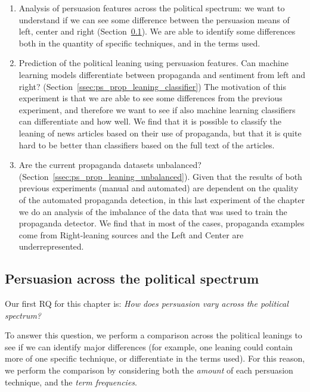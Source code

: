 \begin{enumerate}
    \item Analysis of persuasion features across the political spectrum: we want to understand if we can see some difference between the persuasion means of left, center and right (Section~\ref{ssec:ps_prop_leaning_across}). We are able to identify some differences both in the quantity of specific techniques, and in the terms used.
    \item Prediction of the political leaning using persuasion features. Can machine learning models differentiate between propaganda and sentiment from left and right? (Section~\ref{ssec:ps_prop_leaning_classifier}) The motivation of this experiment is that we are able to see some differences from the previous experiment, and therefore we want to see if also machine learning classifiers can differentiate and how well. We find that it is possible to classify the leaning of news articles based on their use of propaganda, but that it is quite hard to be better than classifiers based on the full text of the articles. 
    \item Are the current propaganda datasets unbalanced? (Section~\ref{ssec:ps_prop_leaning_unbalanced}). Given that the results of both previous experiments (manual and automated) are dependent on the quality of the automated propaganda detection, in this last experiment of the chapter we do an analysis of the imbalance of the data that was used to train the propaganda detector. We find that in most of the cases, propaganda examples come from Right-leaning sources and the Left and Center are underrepresented.
\end{enumerate}

\subsection{\statusgreen Persuasion across the political spectrum}
\label{ssec:ps_prop_leaning_across}

Our first RQ for this chapter is: \emph{How does persuasion vary across the political spectrum?}

To answer this question, we perform a comparison across the political leanings to see if we can identify major differences (for example, one leaning could contain more of one specific technique, or differentiate in the terms used).
For this reason, we perform the comparison by considering both the \emph{amount} of each persuasion technique, and the \emph{term frequencies}.

